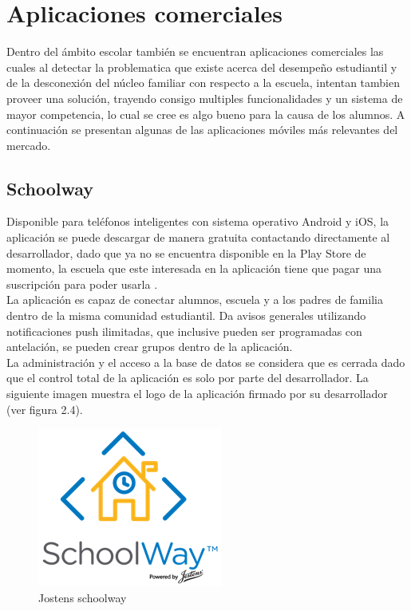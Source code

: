     \section{Aplicaciones comerciales}
        
        Dentro del ámbito escolar también se encuentran aplicaciones comerciales las cuales al detectar la problematica que existe acerca del desempeño estudiantil y de la desconexión del núcleo familiar con respecto a la escuela, intentan tambien proveer una solución, trayendo consigo multiples funcionalidades y un sistema de mayor competencia, lo cual se cree es algo bueno para la causa de los alumnos. A continuación se presentan algunas de las aplicaciones móviles más relevantes del mercado.
    
        
        \subsection{Schoolway}
        
            Disponible para teléfonos inteligentes con sistema operativo Android y iOS, la aplicación se puede descargar de manera gratuita contactando directamente al desarrollador, dado que ya no se encuentra disponible en la Play Store de momento, la escuela que este interesada en la aplicación tiene que pagar una suscripción para poder usarla \cite{schoolway}. \\ La aplicación es capaz de conectar alumnos, escuela y a los padres de familia dentro de la misma comunidad estudiantil. Da avisos generales utilizando notificaciones push ilimitadas, que inclusive pueden ser programadas con antelación, se pueden crear grupos dentro de la aplicación. \\ La administración y el acceso a la base de datos se considera que es cerrada dado que el control total de la aplicación es solo por parte del desarrollador. La siguiente imagen muestra el logo de la aplicación firmado por su desarrollador (ver figura 2.4).

            \begin{figure}[H]
                \centering
                \includegraphics[scale=3.0]{Propuesta_Plantilla_Tesis_LaTeX_UAG/imagenes/schoolway.png}
                \caption{Jostens schoolway}
                \label{fig:schoolway}
            \end{figure}


